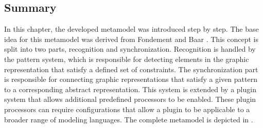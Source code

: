



\subsection{Summary}
In this chapter, the developed metamodel was introduced step by step. The base idea for this metamodel was derived from Fondement and Baar \cite{fondement_making_2005}. This concept is split into two parts, recognition and synchronization. Recognition is handled by the pattern system, which is responsible for detecting elements in the graphic representation that satisfy a defined set of constraints. The synchronization part is responsible for connecting graphic representations that satisfy a given pattern to a corresponding abstract representation. This system is extended by a plugin system that allows additional predefined processors to be enabled. These plugin processors can require configurations that allow a plugin to be applicable to a broader range of modeling languages. The complete metamodel is depicted in .

